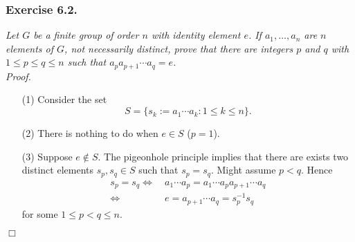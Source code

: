 \documentclass{article}
\begin{document}
\subsubsection*{Exercise 6.2.}
\emph{Let $G$ be a finite group of order $n$ with identity element $e$.
If $a_1, \ldots, a_n$ are $n$ elements of $G$, not necessarily distinct,
prove that there are integers $p$ and $q$ with
$1 \leq p \leq q \leq n$ such that $a_p a_{p+1} \cdots a_q = e$.} \\



\emph{Proof.}
\begin{enumerate}
\item[(1)]
  Consider the set
  \[
    S
    = \{ s_k := a_1 \cdots a_k : 1 \leq k \leq n \}.
  \]

\item[(2)]
  There is nothing to do when $e \in S$ ($p = 1$).

\item[(3)]
  Suppose $e \not\in S$.
  The pigeonhole principle implies that
  there are exists two distinct elements $s_p, s_q \in S$ such that $s_p = s_q$.
  Might assume $p < q$.
  Hence
  \begin{align*}
    s_p = s_q
    \Longleftrightarrow &\:
    a_1 \cdots a_p = a_1 \cdots a_p a_{p+1} \cdots a_q \\
    \Longleftrightarrow &\:
    e = a_{p+1} \cdots a_q = s_p^{-1} s_q
  \end{align*}
  for some $1 \leq p < q \leq n$.
\end{enumerate}
$\Box$ \\\\



\end{document}
